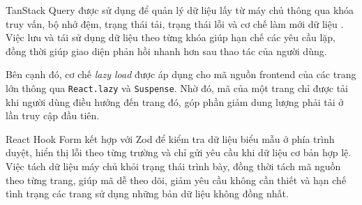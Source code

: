 TanStack Query được sử dụng để quản lý dữ liệu lấy từ máy chủ thông qua khóa truy vấn, bộ nhớ đệm, trạng thái tải, trạng thái lỗi và cơ chế làm mới dữ liệu \cite{tanstackquerydocs}. Việc lưu và tái sử dụng dữ liệu theo từng khóa giúp hạn chế các yêu cầu lặp, đồng thời giúp giao diện phản hồi nhanh hơn sau thao tác của người dùng.

Bên cạnh đó, cơ chế \textit{lazy load} được áp dụng cho mã nguồn frontend của các trang lớn thông qua \texttt{React.lazy} và \texttt{Suspense}. Nhờ đó, mã của một trang chỉ được tải khi người dùng điều hướng đến trang đó, góp phần giảm dung lượng phải tải ở lần truy cập đầu tiên.

React Hook Form kết hợp với Zod để kiểm tra dữ liệu biểu mẫu ở phía trình duyệt, hiển thị lỗi theo từng trường và chỉ gửi yêu cầu khi dữ liệu cơ bản hợp lệ. Việc tách dữ liệu máy chủ khỏi trạng thái trình bày, đồng thời tách mã nguồn theo từng trang, giúp mã dễ theo dõi, giảm yêu cầu không cần thiết và hạn chế tình trạng các trang sử dụng những bản dữ liệu không đồng nhất.





